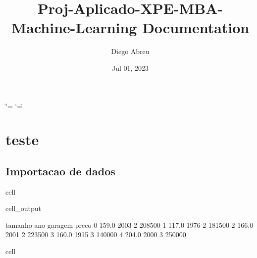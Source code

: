 \documentclass[letterpaper,10pt,brazil]{sphinxmanual}
\title{Proj-Aplicado-XPE-MBA-Machine-Learning Documentation}
\date{Jul 01, 2023}
\author{Diego Abreu}
\begin{document}
\ifdefined\shorthandoff
  \ifnum\catcode`\=\string=\active\shorthandoff{=}\fi
  \ifnum\catcode`\"=\active{}\fi
\fi

\pagestyle{empty}
\sphinxmaketitle
\pagestyle{plain}
\sphinxtableofcontents
\pagestyle{normal}
\label{\detokenize{index::doc}}


\sphinxstepscope


\chapter{teste}
\label{\detokenize{notebooks/teste:teste}}\label{\detokenize{notebooks/teste::doc}}

\section{Importacao de dados}
\label{\detokenize{notebooks/teste:importacao-de-dados}}
\begin{sphinxuseclass}{cell}
\begin{sphinxuseclass}{cell_output}
\begin{sphinxVerbatim}[commandchars=\\\{\}]
   tamanho   ano  garagem   preco
0    159.0  2003        2  208500
1    117.0  1976        2  181500
2    166.0  2001        2  223500
3    160.0  1915        3  140000
4    204.0  2000        3  250000
\end{sphinxVerbatim}

\end{sphinxuseclass}
\end{sphinxuseclass}
\begin{sphinxuseclass}{cell}
\end{sphinxuseclass}
\end{document}
